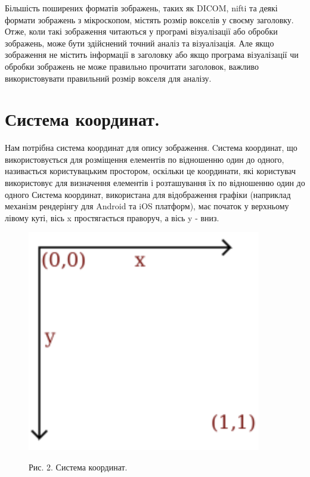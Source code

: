 \documentclass[11pt]{article}
\begin{document}
    Більшість поширених форматів зображень, таких як DICOM, nifti та деякі формати зображень з мікроскопом, містять розмір вокселів у своєму заголовку.
    Отже, коли такі зображення читаються у програмі візуалізації або обробки зображень, може бути здійснений точний аналіз та візуалізація.
    Але якщо зображення не містить інформації в заголовку або якщо програма візуалізації чи обробки зображень не може правильно прочитати заголовок, важливо використовувати правильний розмір вокселя для аналізу.


    \section{Система координат.}\label{sec:coordinate_system}
    Нам потрібна система координат для опису зображення.
    Cистема координат, що використовується для розміщення елементів по відношенню один до одного, називається користувацьким простором, оскільки це координати, які користувач використовує для визначення елементів і розташування їх по відношенню один до одного
    Система координат, використана для відображення графіки (наприклад механізм рендерінгу для Android та iOS платформ), має початок у верхньому лівому куті, вісь x простягається праворуч, а вісь y - вниз.

    \begin{figure}
        \label{fig:image2}
        \centering
        \includegraphics[scale=0.5]{image2.png}

        Рис. 2. Система координат.
    \end{figure}

    \pagebreak
\end{document}

